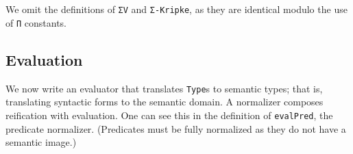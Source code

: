 \documentclass[authoryear, acmsmall, screen, review, nonacm]{acmart}
\begin{document}
\begin{code}[hide]
\>[0]\AgdaSpace{}%
\AgdaSymbol{\{}\AgdaSpace{}%
\AgdaSymbol{=}\AgdaSpace{}%
\AgdaOperator{\AgdaInductiveConstructor{R[}}\AgdaSpace{}%
\AgdaSpace{}%
\AgdaOperator{\AgdaInductiveConstructor{]}}\AgdaSymbol{\}}\AgdaSpace{}%
\AgdaSpace{}%
\AgdaSymbol{=}\AgdaSpace{}%
\AgdaSpace{}%
\AgdaSpace{}%
\AgdaSpace{}%
\AgdaSpace{}%
\AgdaSpace{}%
\AgdaSymbol{)}\AgdaSpace{}%
\AgdaSpace{}%
\<%
\\
\>[0]\AgdaSpace{}%
\AgdaSymbol{:}\AgdaSpace{}%
\AgdaSpace{}%
\AgdaSpace{}%
\AgdaOperator{\AgdaInductiveConstructor{R[}}\AgdaSpace{}%
\AgdaSpace{}%
\AgdaOperator{\AgdaInductiveConstructor{]}}\AgdaSpace{}%
\<%
\\
\>[0]\AgdaSpace{}%
\AgdaSymbol{=}\AgdaSpace{}%
\AgdaSpace{}%
\AgdaSpace{}%
\AgdaSpace{}%
\AgdaSpace{}%
\AgdaSpace{}%
\<%
\end{code}

\Ni We omit the definitions of \verb!ΣV! and \verb!Σ-Kripke!, as they are identical modulo the use of \verb!Π! constants.

\subsection{Evaluation}

We now write an evaluator that translates \verb!Type!s to semantic types; that is, translating syntactic forms to the semantic domain. A normalizer composes reification with evaluation. One can see this in the definition of \verb!evalPred!, the predicate normalizer. (Predicates must be fully normalized as they do not have a semantic image.)
\end{document}
